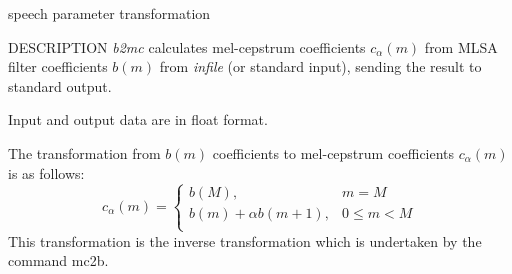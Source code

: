 % 
% 
% 
% 
%                                                                        
%
%
{speech parameter transformation}

\begin{synopsis}
\item [b2mc] [ --m $M$ ] [ --a $A$ ] [ {\em infile} ]
\end{synopsis}

\begin{qsection}{DESCRIPTION}
{\em b2mc} calculates mel-cepstrum coefficients $c_\alpha(m)$ 
from MLSA filter coefficients $b(m)$ from {\em infile} (or standard input), 
sending the result to standard output.

Input and output data are in float format.

The transformation from $b(m)$ coefficients to mel-cepstrum coefficients
$c_\alpha(m)$ is as follows:
\begin{displaymath}
c_\alpha(m) = \left\{
	\begin{array}{ll}
	  b(M), & m=M \\
	  b(m) + \alpha b(m+1), & 0 \leq m < M \\
	\end{array} \right.
\end{displaymath}
This transformation is the inverse transformation which is undertaken
by the command mc2b.

\end{qsection}

